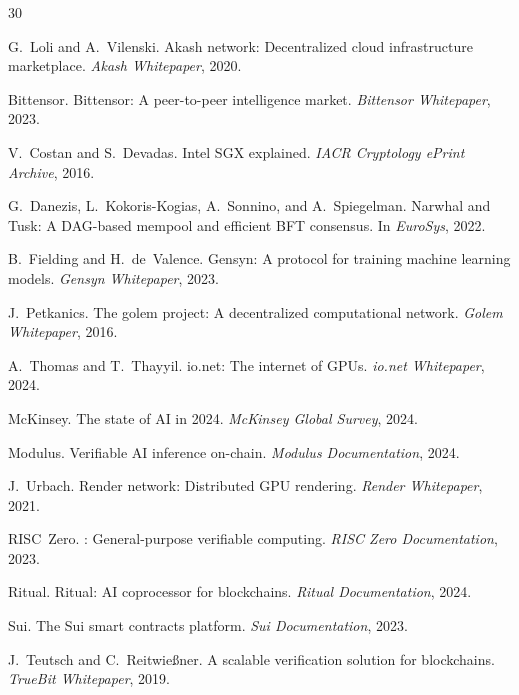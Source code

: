 
\begin{thebibliography}{30}

G.~Loli and A.~Vilenski.
\newblock Akash network: Decentralized cloud infrastructure marketplace.
\newblock \emph{Akash Whitepaper}, 2020.

Bittensor.
\newblock Bittensor: A peer-to-peer intelligence market.
\newblock \emph{Bittensor Whitepaper}, 2023.

V.~Costan and S.~Devadas.
\newblock Intel {SGX} explained.
\newblock \emph{IACR Cryptology ePrint Archive}, 2016.

G.~Danezis, L.~Kokoris-Kogias, A.~Sonnino, and A.~Spiegelman.
\newblock Narwhal and {Tusk}: A {DAG}-based mempool and efficient {BFT} consensus.
\newblock In \emph{EuroSys}, 2022.

B.~Fielding and H.~de~Valence.
\newblock Gensyn: A protocol for training machine learning models.
\newblock \emph{Gensyn Whitepaper}, 2023.

J.~Petkanics.
\newblock The golem project: A decentralized computational network.
\newblock \emph{Golem Whitepaper}, 2016.

A.~Thomas and T.~Thayyil.
\newblock io.net: The internet of {GPU}s.
\newblock \emph{io.net Whitepaper}, 2024.

McKinsey.
\newblock The state of {AI} in 2024.
\newblock \emph{McKinsey Global Survey}, 2024.

Modulus.
\newblock Verifiable {AI} inference on-chain.
\newblock \emph{Modulus Documentation}, 2024.

J.~Urbach.
\newblock Render network: Distributed {GPU} rendering.
\newblock \emph{Render Whitepaper}, 2021.

RISC~Zero.
: General-purpose verifiable computing.
\newblock \emph{RISC Zero Documentation}, 2023.

Ritual.
\newblock Ritual: {AI} coprocessor for blockchains.
\newblock \emph{Ritual Documentation}, 2024.

Sui.
\newblock The {Sui} smart contracts platform.
\newblock \emph{Sui Documentation}, 2023.

J.~Teutsch and C.~Reitwie{\ss}ner.
\newblock A scalable verification solution for blockchains.
\newblock \emph{TrueBit Whitepaper}, 2019.


\end{thebibliography}
